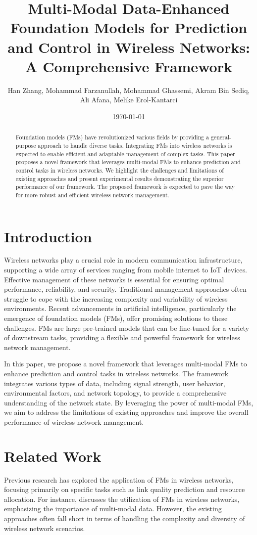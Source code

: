 \documentclass{article}
\title{Multi-Modal Data-Enhanced Foundation Models for Prediction and Control in Wireless Networks: A Comprehensive Framework}
\author{Han Zhang, Mohammad Farzanullah, Mohammad Ghassemi, Akram Bin Sediq, Ali Afana, Melike Erol-Kantarci}
\date{\today}
\begin{document}
\maketitle

\begin{abstract}
Foundation models (FMs) have revolutionized various fields by providing a general-purpose approach to handle diverse tasks. Integrating FMs into wireless networks is expected to enable efficient and adaptable management of complex tasks. This paper proposes a novel framework that leverages multi-modal FMs to enhance prediction and control tasks in wireless networks. We highlight the challenges and limitations of existing approaches and present experimental results demonstrating the superior performance of our framework. The proposed framework is expected to pave the way for more robust and efficient wireless network management.
\end{abstract}

\section{Introduction}
Wireless networks play a crucial role in modern communication infrastructure, supporting a wide array of services ranging from mobile internet to IoT devices. Effective management of these networks is essential for ensuring optimal performance, reliability, and security. Traditional management approaches often struggle to cope with the increasing complexity and variability of wireless environments. Recent advancements in artificial intelligence, particularly the emergence of foundation models (FMs), offer promising solutions to these challenges. FMs are large pre-trained models that can be fine-tuned for a variety of downstream tasks, providing a flexible and powerful framework for wireless network management. 

In this paper, we propose a novel framework that leverages multi-modal FMs to enhance prediction and control tasks in wireless networks. The framework integrates various types of data, including signal strength, user behavior, environmental factors, and network topology, to provide a comprehensive understanding of the network state. By leveraging the power of multi-modal FMs, we aim to address the limitations of existing approaches and improve the overall performance of wireless network management.

\section{Related Work}
Previous research has explored the application of FMs in wireless networks, focusing primarily on specific tasks such as link quality prediction and resource allocation. For instance, \cite{zhang2026multimodaldataenhancedfoundationmodels} discusses the utilization of FMs in wireless networks, emphasizing the importance of multi-modal data. However, the existing approaches often fall short in terms of handling the complexity and diversity of wireless network scenarios. 
\end{document}

